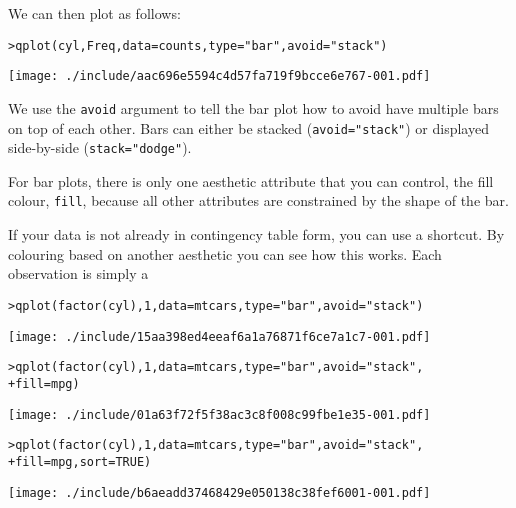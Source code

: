 We can then plot as follows:

\begin{alltt}
> qplot(cyl, Freq, data = counts, type = "bar", avoid = "stack")
\end{alltt}
\texttt{[image: ./include/aac696e5594c4d57fa719f9bcce6e767-001.pdf]}
\begin{alltt}

\end{alltt}%

We use the {\tt avoid} argument to tell the bar plot how to avoid have multiple bars on top of each other.  Bars can either be stacked ({\tt avoid="stack"}) or displayed side-by-side ({\tt stack="dodge"}).  

For bar plots, there is only one aesthetic attribute that you can control, the fill colour, {\tt fill}, because all other attributes are constrained by the shape of the bar.

If your data is not already in contingency table form, you can use a shortcut.  By colouring based on another aesthetic you can see how this works.  Each observation is simply a 

\begin{alltt}
> qplot(factor(cyl), 1, data = mtcars, type = "bar", avoid = "stack")
\end{alltt}
\texttt{[image: ./include/15aa398ed4eeaf6a1a76871f6ce7a1c7-001.pdf]}
\begin{alltt}

> qplot(factor(cyl), 1, data = mtcars, type = "bar", avoid = "stack", 
+     fill = mpg)
\end{alltt}
\texttt{[image: ./include/01a63f72f5f38ac3c8f008c99fbe1e35-001.pdf]}
\begin{alltt}

> qplot(factor(cyl), 1, data = mtcars, type = "bar", avoid = "stack", 
+     fill = mpg, sort = TRUE)
\end{alltt}
\texttt{[image: ./include/b6aeadd37468429e050138c38fef6001-001.pdf]}
\begin{alltt}

\end{alltt}%

